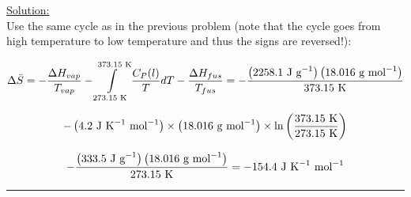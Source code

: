 \noindent
\underline{Solution:}\\


Use the same cycle as in the previous problem (note that the cycle goes from high temperature to low temperature and thus the signs are reversed!):

$$\Delta\bar{S} = -\frac{\Delta H_{vap}}{T_{vap}} - \int\limits_{273.15\textnormal{ K}}^{373.15\textnormal{ K}}\frac{C_P(l)}{T}dT - \frac{\Delta H_{fus}}{T_{fus}} = -\frac{\left(2258.1\textnormal{ J g}^{-1}\right)\left(18.016\textnormal{ g mol}^{-1}\right)}{373.15\textnormal{ K}}$$

$$-\left(4.2\textnormal{ J K}^{-1}\textnormal{ mol}^{-1}\right)\times\left(18.016\textnormal{ g mol}^{-1}\right)\times\ln\left(\frac{373.15\textnormal{ K}}{273.15\textnormal{ K}}\right)$$

$$ - \frac{\left(333.5\textnormal{ J g}^{-1}\right)\left(18.016\textnormal{ g mol}^{-1}\right)}{273.15\textnormal{ K}} = -154.4\textnormal{ J K}^{-1}\textnormal{ mol}^{-1}$$

\hrule\vspace{0.5cm}
